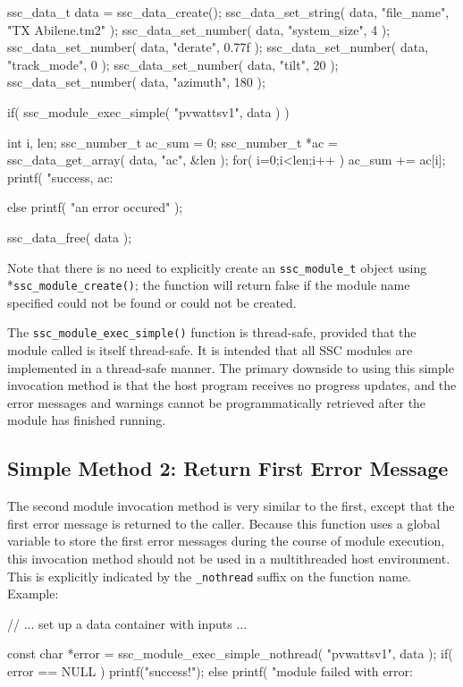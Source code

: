 \documentclass{scrartcl} %
\begin{document}
\begin{verbatimtab}[4]
ssc_data_t data = ssc_data_create();
ssc_data_set_string( data, "file_name", "TX Abilene.tm2" );
ssc_data_set_number( data, "system_size", 4 );
ssc_data_set_number( data, "derate", 0.77f );
ssc_data_set_number( data, "track_mode", 0 );
ssc_data_set_number( data, "tilt", 20 );
ssc_data_set_number( data, "azimuth", 180 );

if( ssc_module_exec_simple( "pvwattsv1", data ) )
{
	int i, len;
	ssc_number_t ac_sum = 0;
	ssc_number_t *ac = ssc_data_get_array( data, "ac", &len );
	for( i=0;i<len;i++ ) ac_sum += ac[i];
	printf( "success, ac: %

}
else
	printf( "an error occured\n" );

ssc_data_free( data );
\end{verbatimtab}

Note that there is no need to explicitly create an \texttt{ssc\_module\_t} object using \\*\texttt{ssc\_module\_create()}; the function will return false if the module name specified could not be found or could not be created.

The \texttt{ssc\_module\_exec\_simple()} function is thread-safe, provided that the module called is itself thread-safe.  It is intended that all SSC modules are implemented in a thread-safe manner.  The primary downside to using this simple invocation method is that the host program receives no progress updates, and the error messages and warnings cannot be programmatically retrieved after the module has finished running.

\subsection{Simple Method 2: Return First Error Message}
The second module invocation method is very similar to the first, except that the first error message is returned to the caller.  Because this function uses a global variable to store the first error messages during the course of module execution, this invocation method should not be used in a multithreaded host environment.  This is explicitly indicated by the \texttt{\_nothread} suffix on the function name.  Example:

\begin{verbatimtab}[4]
// ... set up a data container with inputs ...

const char *error = ssc_module_exec_simple_nothread( "pvwattsv1", data );
if( error == NULL )
	printf("success!\n");
else
	printf( "module failed with error: %
\end{verbatimtab}
\end{document}
